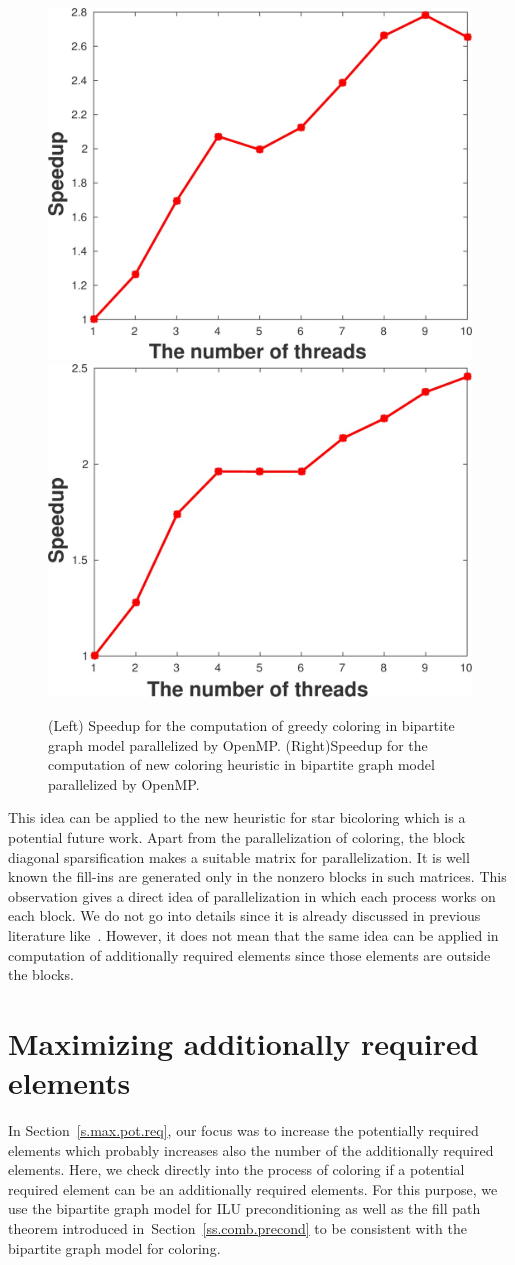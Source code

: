 \documentclass[12pt, twoside,a4paper,toc=bibliography]{scrbook}
\newcommand{\secref}[1]{Section~\protect\ref{#1}}
\begin{document}
\begin{figure}
\includegraphics[width=0.44\linewidth]{ths_spd.jpg}\hfill
\includegraphics[width=0.47\linewidth]{ths_spd2.jpg}
\caption{
(Left) Speedup for the computation of greedy coloring in bipartite graph model parallelized by OpenMP.
(Right)Speedup for the computation of new coloring heuristic in bipartite graph model parallelized by OpenMP.
}
\label{speedups}
\end{figure}

This idea can be applied to the new heuristic for star bicoloring which is a potential future work.
Apart from the parallelization of coloring, the block diagonal sparsification makes a suitable
matrix for parallelization. It is well known the fill-ins are generated only in the nonzero blocks in such matrices. This observation gives a direct idea of parallelization in which each process
works on each block. We do not go into details since it is already discussed in previous literature like~\cite{parblockilu}. However, it does not mean that the same idea can be applied in computation of
additionally required elements since those elements are outside the blocks.


\section{Maximizing additionally required elements}
\label{s.max.add.req}
In \secref{s.max.pot.req}, our focus was to increase the potentially required elements
which probably increases also the number of the additionally required elements.
Here, we check directly into the process of coloring
if a potential required element can be an additionally required elements.
For this purpose, we use the bipartite graph model for ILU preconditioning
as well as the fill path theorem introduced
in~\secref{ss.comb.precond} to be consistent with the bipartite graph model for coloring.
\end{document}
